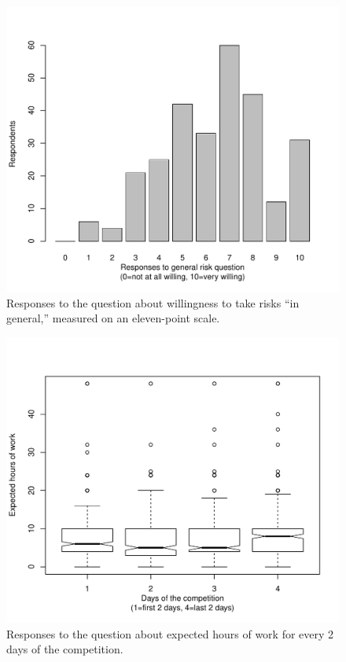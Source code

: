 \documentclass[12pt,]{article}
\theoremstyle{plain} %
\begin{document}
\begin{figure}
\centering
\includegraphics{Figures/risk-1.pdf}
\caption{Responses to the question about willingness to take risks ``in
general,'' measured on an eleven-point scale.}
\end{figure}

\begin{figure}
\centering
\includegraphics{Figures/looking-ahead-1.pdf}
\caption{Responses to the question about expected hours of work for
every 2 days of the competition.}
\end{figure}
\end{document}
